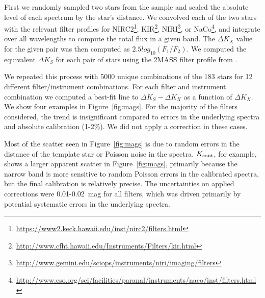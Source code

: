 \documentclass[twocolumn]{aastex62}
\begin{document}
First we randomly sampled two stars from the sample and scaled the absolute level of each spectrum by the star's distance. We convolved each of the two stars with the relevant filter profiles for NIRC2\footnote{\href{https://www2.keck.hawaii.edu/inst/nirc2/filters.html}{https://www2.keck.hawaii.edu/inst/nirc2/filters.html}}, KIR\footnote{\href{http://www.cfht.hawaii.edu/Instruments/Filters/kir.html}{http://www.cfht.hawaii.edu/Instruments/Filters/kir.html}}, NIRI\footnote{\href{http://www.gemini.edu/sciops/instruments/niri/imaging/filters}{http://www.gemini.edu/sciops/instruments/niri/imaging/filters}}, or NaCo\footnote{\href{http://www.eso.org/sci/facilities/paranal/instruments/naco/inst/filters.html}{http://www.eso.org/sci/facilities/paranal/instruments/naco/inst/filters.html}}, and integrate over all wavelengths to compute the total flux in a given band. The $\Delta K_X$ value for the given pair was then computed as $2.5log_{10}(F_1/F_2)$. We computed the equivalent $\Delta K_S$ for each pair of stars using the 2MASS filter profile from \citet{2003AJ....126.1090C}.  

We repeated this process with 5000 unique combinations of the 183 stars for 12 different filter/instrument combinations. For each filter and instrument combination we computed a best-fit line to $\Delta K_S -\Delta K_X$ as a function of $\Delta K_X$. We show four examples in Figure~\ref{fig:mags}. For the majority of the filters considered, the trend is insignificant compared to errors in the underlying spectra and absolute calibration (1-2\%). We did not apply a correction in these cases. 

Most of the scatter seen in Figure~\ref{fig:mags} is due to random errors in the distance of the template star or Poisson noise in the spectra. $K_{\rm{cont}}$, for example, shows a larger apparent scatter in Figure~\ref{fig:mags}, primarily because the narrow band is more sensitive to random Poisson errors in the calibrated spectra, but the final calibration is relatively precise. The uncertainties on applied corrections were 0.01-0.02~mag for all filters, which was driven primarily by potential systematic errors in the underlying spectra. 
\end{document}

